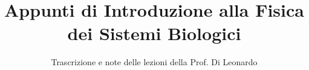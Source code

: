 \documentclass[a4paper,12pt]{article}
\title{Appunti di Introduzione alla Fisica dei Sistemi Biologici}
\author{Trascrizione e note delle lezioni della Prof. Di Leonardo}
\date{}
\begin{document}
\maketitle
\projectintro
\tableofcontents
\newpage

\end{document}
